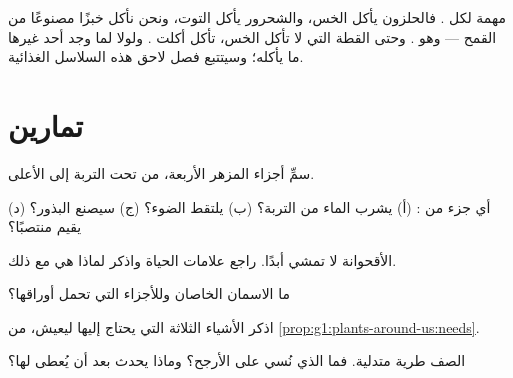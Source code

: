 \begin{remark}\label{rem:g1:plants-around-us:food}
 مهمة لكل . فالحلزون يأكل الخس، والشحرور يأكل التوت،
ونحن نأكل خبزًا مصنوعًا من القمح --- وهو . وحتى القطة التي لا
تأكل الخس، تأكل  أكلت . ولولا  لما وجد أحد
غيرها ما يأكله؛ وسيتتبع فصل لاحق هذه السلاسل الغذائية.
\end{remark}

\section{تمارين}

\begin{exercise}[$\star$]\label{exo:g1:plants-around-us:1}
سمِّ أجزاء  المزهر الأربعة، من تحت التربة إلى الأعلى.
\end{exercise}

\begin{exercise}[$\star$]\label{exo:g1:plants-around-us:2}
أي جزء من : (أ) يشرب الماء من التربة؟ (ب) يلتقط الضوء؟
(ج) سيصنع البذور؟ (د) يقيم  منتصبًا؟
\end{exercise}

\begin{exercise}[$\star$]\label{exo:g1:plants-around-us:3}
الأقحوانة لا تمشي أبدًا. راجع علامات الحياة واذكر لماذا هي  مع ذلك.
\end{exercise}

\begin{exercise}[$\star$]\label{exo:g1:plants-around-us:4}
ما الاسمان الخاصان   وللأجزاء التي تحمل أوراقها؟
\end{exercise}

\begin{exercise}[$\star$]\label{exo:g1:plants-around-us:5}
اذكر الأشياء الثلاثة التي يحتاج إليها  ليعيش، من
\cref{prop:g1:plants-around-us:needs}.
\end{exercise}

\begin{exercise}[$\star$]\label{exo:g1:plants-around-us:6}
  الصف طرية متدلية. فما الذي نُسي على الأرجح؟ وماذا يحدث
بعد أن يُعطى لها؟
\end{exercise}

